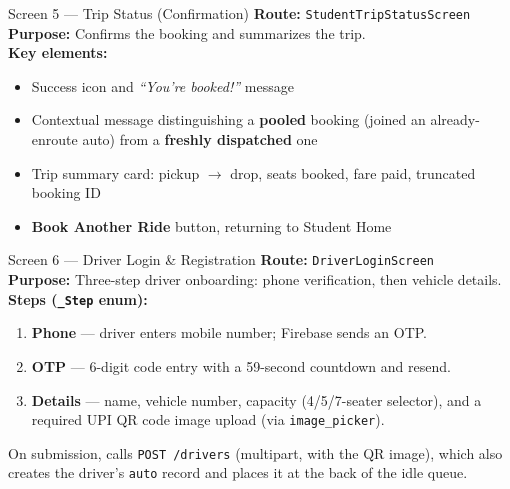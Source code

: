 \documentclass[11pt,a4paper]{article}
\begin{document}
\begin{screenbox}{Screen 5 --- Trip Status (Confirmation)}
\textbf{Route:} \texttt{StudentTripStatusScreen} \\[4pt]
\textbf{Purpose:} Confirms the booking and summarizes the trip. \\[4pt]
\textbf{Key elements:}
\begin{itemize}[leftmargin=*, itemsep=1pt]
  \item Success icon and \textit{``You're booked!''} message
  \item Contextual message distinguishing a \textbf{pooled} booking (joined an
        already-enroute auto) from a \textbf{freshly dispatched} one
  \item Trip summary card: pickup $\rightarrow$ drop, seats booked, fare paid,
        truncated booking ID
  \item \textbf{Book Another Ride} button, returning to Student Home
\end{itemize}
\end{screenbox}

\begin{screenbox}{Screen 6 --- Driver Login \& Registration}
\textbf{Route:} \texttt{DriverLoginScreen} \\[4pt]
\textbf{Purpose:} Three-step driver onboarding: phone verification, then vehicle
details. \\[4pt]
\textbf{Steps (\texttt{\_Step} enum):}
\begin{enumerate}[leftmargin=*, itemsep=1pt]
  \item \textbf{Phone} --- driver enters mobile number; Firebase sends an OTP.
  \item \textbf{OTP} --- 6-digit code entry with a 59-second countdown and resend.
  \item \textbf{Details} --- name, vehicle number, capacity (4/5/7-seater selector),
        and a required UPI QR code image upload (via \texttt{image\_picker}).
\end{enumerate}
On submission, calls \texttt{POST /drivers} (multipart, with the QR image), which
also creates the driver's \texttt{auto} record and places it at the back of the idle
queue.
\end{screenbox}
\end{document}
